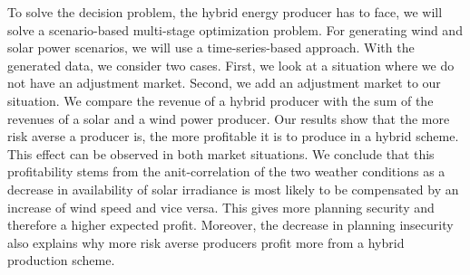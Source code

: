 To solve the  decision problem, the hybrid energy producer has to face, we will solve a scenario-based multi-stage optimization problem. For generating wind and solar power scenarios, we will use a time-series-based approach. With the generated data, we consider two cases. First, we look at a situation where we do not have an adjustment market. Second, we add an adjustment market to our situation. We compare the revenue of a hybrid producer with the sum of the revenues of a solar and a wind power producer. Our results show that the more risk averse a producer is, the more profitable it is to produce in a hybrid scheme. This effect can be observed in both market situations. We conclude that this profitability stems from the anit-correlation of the two weather conditions as a decrease in availability of solar irradiance is most likely to be compensated by an increase of wind speed and vice versa. This gives more planning security and therefore a higher expected profit. Moreover, the decrease in planning insecurity also explains why more risk averse producers profit more from a hybrid production scheme.  
